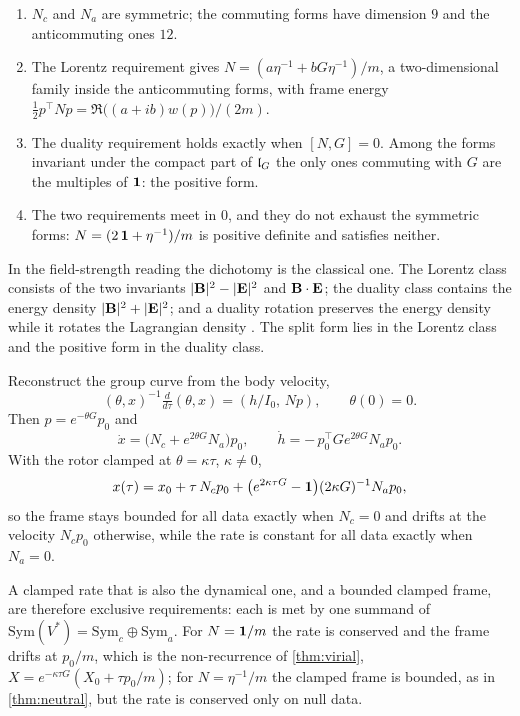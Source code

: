 \begin{theorem}
\label{thm:inertiareq}
\begin{enumerate}[label=(\roman*),leftmargin=2.2em]
\item $N_c$ and $N_a$ are symmetric; the commuting forms have dimension $9$ and the anticommuting ones $12$.
\item The Lorentz requirement gives $N=(a\eta^{-1}+bG\eta^{-1})/m$, a two-dimensional family inside the anticommuting forms, with frame energy
$\tfrac12p^{\!\top}Np=\Re\bigl((a+ib)w(p)\bigr)/(2m)$.
\item The duality requirement holds exactly when $[N,G]=0$. Among the forms invariant under the compact part of $\mathfrak l_G$ the only ones commuting with
$G$ are the multiples of $\mathbf 1$: the positive form.
\item The two requirements meet in $0$, and they do not exhaust the symmetric forms: $N=(2\,\mathbf 1+\eta^{-1})/m$ is positive definite and satisfies
neither.
\end{enumerate}
\end{theorem}

In the field-strength reading the dichotomy is the classical one. The Lorentz class consists of the two invariants $|\mathbf B|^2-|\mathbf E|^2$ and
$\mathbf B\cdot\mathbf E$; the duality class contains the energy density $|\mathbf B|^2+|\mathbf E|^2$; and a duality rotation preserves the energy density while it
rotates the Lagrangian density \cite{Calkin65,DeserTeitelboim76,GaillardZumino81}. The split form lies in the Lorentz class and the positive form
in the duality class.

\begin{theorem}
\label{thm:drift}
Reconstruct the group curve from the body velocity,
\[
(\theta,x)^{-1}\tfrac{d}{d\tau}(\theta,x)=(h/I_0,\,Np),\qquad \theta(0)=0 .
\]
Then $p=e^{-\theta G}p_0$ and
\[
\dot x=\bigl(N_c+e^{2\theta G}N_a\bigr)p_0,\qquad \dot h=-\,p_0^{\!\top}Ge^{2\theta G}N_ap_0 .
\]
With the rotor clamped at $\theta=\kappa\tau$, $\kappa\neq0$,
\[
x(\tau)=x_0+\tau\,N_cp_0+\bigl(e^{2\kappa\tau G}-\mathbf 1\bigr)(2\kappa G)^{-1}N_ap_0 ,
\]
so the frame stays bounded for all data exactly when $N_c=0$ and drifts at the velocity $N_cp_0$ otherwise, while the rate is constant for all data
exactly when $N_a=0$.
\end{theorem}

A clamped rate that is also the dynamical one, and a bounded clamped frame, are therefore exclusive requirements: each is met by one summand of
$\mathrm{Sym}(V^*)=\mathrm{Sym}_c\oplus\mathrm{Sym}_a$. For $N=\mathbf 1/m$ the rate is conserved and the frame drifts at $p_0/m$, which is the
non-recurrence of \cref{thm:virial}, $X=e^{-\kappa\tau G}(X_0+\tau p_0/m)$; for $N=\eta^{-1}/m$ the clamped frame is bounded, as in \cref{thm:neutral},
but the rate is conserved only on null data.

